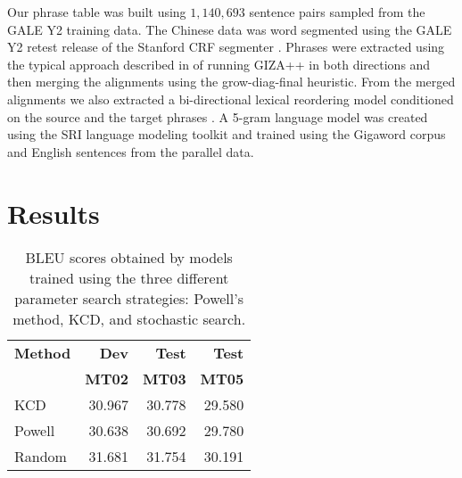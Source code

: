 \documentclass[11pt]{article}
\begin{document}
Our phrase table was built using \mbox{$1,140,693$} sentence pairs sampled from the GALE Y2 training data.  The Chinese data was word segmented using the GALE Y2 retest release of the Stanford CRF segmenter \cite{tseng05}.  Phrases were extracted using the typical approach described in  of running GIZA++ \cite{och03} in both directions and then merging the alignments using the grow-diag-final heuristic. From the merged alignments we also extracted a bi-directional lexical reordering model conditioned on the source and the target phrases \cite{tillmann04} \cite{koehn2007}. A 5-gram language model was created using the SRI language modeling toolkit \cite{stolcke02srilm} and trained using the Gigaword corpus and English sentences from the parallel data. 


  


\section{Results}

\begin{table}
\begin{center}
\begin{tabular}{|l|rrr|}
\hline \bf Method  & \bf Dev  & \bf Test & \bf Test \\ 
                   & \bf MT02 & \bf MT03 & \bf MT05 \\ \hline
KCD        & 30.967 & 30.778 & 29.580 \\
Powell     & 30.638 & 30.692 & 29.780  \\
Random     & 31.681 & 31.754 & 30.191 \\
\hline
\end{tabular}
\end{center}
\caption{
\label{searchstrat}
BLEU scores obtained by models trained using the three different parameter search strategies: Powell's method, KCD, and stochastic search.}
\end{table}
\end{document}
